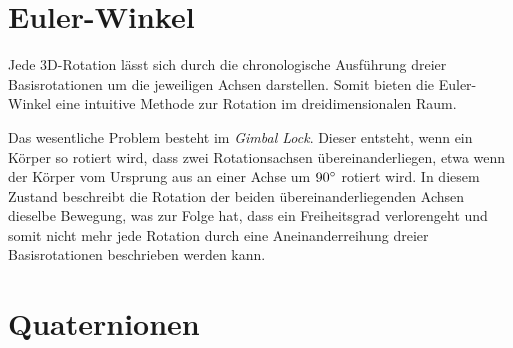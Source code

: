 \documentclass{article} %
\begin{document}
\section{Euler-Winkel}

Jede 3D-Rotation lässt sich durch die chronologische Ausführung dreier Basisrotationen um die jeweiligen Achsen darstellen. Somit bieten die Euler-Winkel eine intuitive Methode zur Rotation im dreidimensionalen Raum.

Das wesentliche Problem besteht im \textit{Gimbal Lock}. Dieser entsteht, wenn ein Körper so rotiert wird, dass zwei Rotationsachsen übereinanderliegen, etwa wenn der Körper vom Ursprung aus an einer Achse um $90 \degree$ rotiert wird. In diesem Zustand beschreibt die Rotation der beiden übereinanderliegenden Achsen dieselbe Bewegung, was zur Folge hat, dass ein Freiheitsgrad verlorengeht und somit nicht mehr jede Rotation durch eine Aneinanderreihung dreier Basisrotationen beschrieben werden kann.

\section{Quaternionen}
\end{document}
